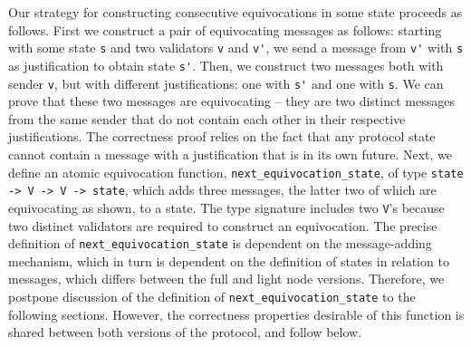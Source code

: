 \documentclass[runningheads]{llncs}
\begin{document}
Our strategy for constructing consecutive equivocations in some state proceeds as follows. First we construct a pair of equivocating messages as follows: starting with some state \verb|s| and two validators \verb|v| and \verb|v'|, we send a message from \verb|v'|  with \verb|s| as justification to obtain state \verb|s'|. Then, we construct two messages both with sender \verb|v|, but with different justifications: one with \verb|s'| and one  with \verb|s|. We can prove that these two messages are equivocating -- they are two distinct messages from the same sender that do not contain each other in their respective justifications. The correctness proof relies on the fact that any protocol state cannot contain a message with a justification that is in its own future. Next, we define an atomic equivocation function, \verb|next_equivocation_state|, of type \verb|state -> V -> V -> state|, which adds three messages, the latter two of which are equivocating as shown, to a state. The type signature includes two \verb|V|'s because two distinct validators are required to construct an equivocation.
The precise definition of \verb|next_equivocation_state| is dependent on the message-adding mechanism, which in turn is dependent on the definition of states in relation to messages, which differs between the full and light node versions. Therefore, we postpone discussion of the definition of \verb|next_equivocation_state| to the following sections. However, the correctness properties desirable of this function is shared between both versions of the protocol, and follow below.
\end{document}
